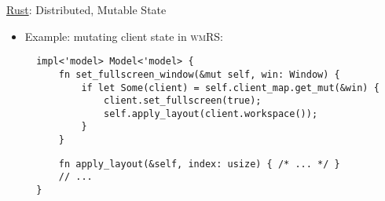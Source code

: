 \begin{frame}[fragile]{\underline{Rust}: Distributed, Mutable State \hfill {\footnotesize \currentname}}


    \begin{itemize}

    \item Example: mutating client state in \textsc{wmRS}:\\[3pt]
\begin{verbatim}
  impl<'model> Model<'model> {
      fn set_fullscreen_window(&mut self, win: Window) {
          if let Some(client) = self.client_map.get_mut(&win) {
              client.set_fullscreen(true);
              self.apply_layout(client.workspace());
          }
      }
\end{verbatim}
\begin{verbatim}
      fn apply_layout(&self, index: usize) { /* ... */ }
      // ...
  }
\end{verbatim}

    \end{itemize}

    \vfill

\end{frame}

